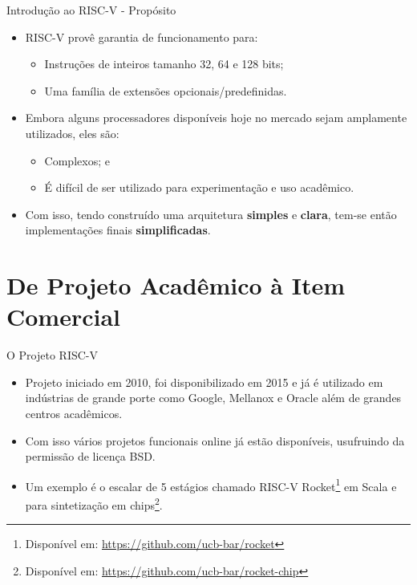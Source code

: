 \documentclass[aspectratio=169]{beamer}
\begin{document}
\begin{frame}{Introdução ao RISC-V - Propósito}
	\begin{itemize}
		\item RISC-V provê garantia de funcionamento  para:
		\begin{itemize}
			\item Instruções de inteiros tamanho 32, 64 e 128 bits;
			\item Uma família de extensões opcionais/predefinidas.
		\end{itemize}

		\item Embora alguns processadores disponíveis hoje no mercado sejam amplamente utilizados, eles são:
		\begin{itemize}
			\item Complexos; e
			\item É difícil de ser utilizado para experimentação e uso acadêmico.
		\end{itemize}

		\item Com isso, tendo construído uma arquitetura \textbf{simples} e \textbf{clara}, tem-se então implementações finais \textbf{simplificadas}.
	\end{itemize}
\end{frame}

\section{De Projeto Acadêmico à Item Comercial}
\begin{frame}{O Projeto RISC-V}
	\begin{itemize}
		\item Projeto iniciado em 2010, foi disponibilizado em 2015 e já é utilizado em indústrias de grande porte como Google, Mellanox e Oracle além de grandes centros acadêmicos.

		\item Com isso vários projetos funcionais online já estão disponíveis, usufruindo da permissão de licença BSD.
			\item Um exemplo é o escalar de 5 estágios chamado RISC-V Rocket\footnote{Disponível em: \url{https://github.com/ucb-bar/rocket}} em Scala e para sintetização em chips\footnote{Disponível em: \url{https://github.com/ucb-bar/rocket-chip}}.
	\end{itemize}
\end{frame}
\end{document}

